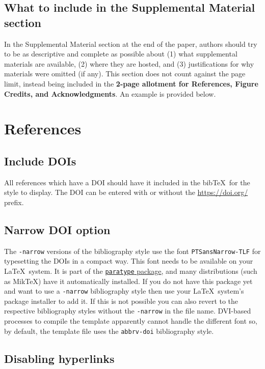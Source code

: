 \documentclass[journal]{vgtc}                %
\begin{document}
\subsection{What to include in the Supplemental Material section}

In the Supplemental Material section at the end of the paper, authors should try to be as descriptive and complete as possible about (1) what supplemental materials are available, (2) where they are hosted, and (3) justifications for why materials were omitted (if any).
This section does not count against the page limit, instead being included in the \textbf{2-page allotment for References, Figure Credits, and Acknowledgments}.
An example is provided below.


\section{References}
\label{sec:references}

\subsection{Include DOIs}

All references which have a DOI should have it included in the bib\TeX\ for the style to display.
The DOI can be entered with or without the \url{https://doi.org/} prefix.

\subsection{Narrow DOI option}

The \verb|-narrow| versions of the bibliography style use the font \verb|PTSansNarrow-TLF| for typesetting the DOIs in a compact way.
This font needs to be available on your \LaTeX\ system.
It is part of the \href{https://www.ctan.org/pkg/paratype}{\texttt{paratype} package}, and many distributions (such as MikTeX) have it automatically installed.
If you do not have this package yet and want to use a \verb|-narrow| bibliography style then use your \LaTeX\ system's package installer to add it.
If this is not possible you can also revert to the respective bibliography styles without the \verb|-narrow| in the file name.
DVI-based processes to compile the template apparently cannot handle the different font so, by default, the template file uses the \texttt{abbrv-doi} bibliography style.

\subsection{Disabling hyperlinks}
\end{document}
